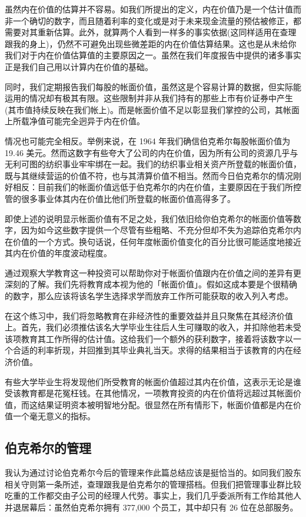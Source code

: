 \documentclass[UTF8,a4paper,zihao=-4,fontset = windows]{ctexart} %
\begin{document}
虽然内在价值的估算并不容易。如我们所提出的定义，内在价值乃是一个估计值而非一个确切的数字，而且随着利率的变化或是对于未来现金流量的预估被修正，都需要对其重新估算。此外，就算两个人看到一样多的事实依据(这同样适用在查理跟我的身上)，仍然不可避免出现些微差距的内在价值估算结果。这也是从未给你我们对于内在价值估算值的主要原因之一。虽然在我们年度报告中提供的诸多事实正是我们自己用以计算内在价值的基础。

同时，我们定期报告我们每股的帐面价值，虽然这是个容易计算的数据，但实际能运用的情况却有极其有限。这些限制并非从我们持有的那些上市有价证券中产生(其市值持续反映在我们帐上)。而是帐面价值不足以彰显我们掌控的公司，其帐面上所载净值可能完全迥异于内在价值。

情况也可能完全相反。举例来说，在 1964 年我们确信伯克希尔每股帐面价值为 19.46 美元。然而这数字有些夸大了公司的内在价值，因为所有公司的资源几乎与无利可图的纺织事业牢牢绑在一起。我们的纺织事业相关资产所登载的帐面价值，既与其继续营运的价值不符，也与其清算价值不相当。然而今日伯克希尔的情况刚好相反：目前我们的帐面价值远低于伯克希尔的内在价值，主要原因在于我们所控管的很多事业体其内在价值比他们所登载的帐面价值高得多了。

即使上述的说明显示帐面价值有不足之处，我们依旧给你伯克希尔的帐面价值等数字，因为如今这些数字提供一个尽管有些粗略、不充分但却不失为追踪伯克希尔内在价值的一个方式。换句话说，任何年度帐面价值变化的百分比很可能适度地接近其内在价值的年度波动程度。

通过观察大学教育这一种投资可以帮助你对于帐面价值跟内在价值之间的差异有更深刻的了解。我们先将教育成本视为他的「帐面价值」。假如这成本要是个很精确的数字，那么应该将该名学生选择求学而放弃工作所可能获取的收入列入考虑。

在这个练习中，我们将忽略教育在非经济性的重要效益并且只聚焦在其经济价值上。首先，我们必须推估该名大学毕业生往后人生可赚取的收入，并扣除他若未受该项教育其工作所得的估计值。这给我们一个额外的获利数字，接着将该数字以一个合适的利率折现，并回推到其毕业典礼当天。求得的结果相当于该教育的内在经济价值。

有些大学毕业生将发现他们所受教育的帐面价值超过其内在价值，这表示无论是谁受该教育都是花冤枉钱。在其他情况，一项教育投资的内在价值将远超过其帐面价值，而这结果证明资本被明智地分配。很显然在所有情形下，帐面价值都是内在价值一个毫无意义的指标。

\subsection{伯克希尔的管理}

我认为通过讨论伯克希尔今后的管理来作此篇总结应该是挺恰当的。如同我们股东相关守则第一条所述，查理跟我是伯克希尔的管理搭档。但我们把管理事业群比较吃重的工作都交由子公司的经理人代劳。事实上，我们几乎委派所有工作给其他人并退居幕后：虽然伯克希尔拥有 377,000 个员工，其中却只有 26 位在总部服务。
\end{document}
